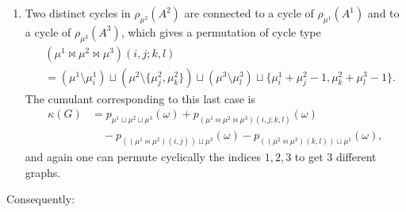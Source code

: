 \documentclass[12pt,a4paper,reqno]{amsart}
\theoremstyle{remark}
\begin{document}
\begin{enumerate}
\begin{align*}
&\,\,\,\,\,\,-p_{((\mu^{2}\Join \mu^{3})(j,k)) \sqcup \mu^{1}}(\omega)-p_{((\mu^{1}\Join \mu^{3})(i,k)) \sqcup \mu^{2}}(\omega).\end{align*}
Here, there is no need to permute cyclically the indices in the enumeration for $N_{G}$.\vspace{2mm}
\item Two distinct cycles in $\rho_{\mu^{2}}(A^{2})$ are connected to a cycle of $\rho_{\mu^{1}}(A^{1})$ and to a cycle of $\rho_{\mu^{3}}(A^{3})$, which gives a permutation of cycle type
\begin{align*}
&( \mu^{1} \Join \mu^{2} \Join \mu^{3}) (i,j;k,l)\\
&=(\mu^{1}\setminus \mu^{1}_{i})\sqcup (\mu^{2}\setminus \{\mu^{2}_{j},\mu^{2}_{k}\})\sqcup (\mu^{3}\setminus \mu^{3}_{l})\sqcup\{\mu^{1}_{i}+\mu^{2}_{j}-1,\mu^{2}_{k}+\mu^{3}_{l}-1\}.
\end{align*}
The cumulant corresponding to this last  case is
\begin{align*}\kappa(G)&=p_{\mu^{1}\sqcup \mu^{2}\sqcup \mu^{3}}(\omega)+p_{(\mu^{1}\Join \mu^{2}\Join \mu^{3})(i,j;k,l)}(\omega)\\
&\,\,\,\,\,\,-p_{((\mu^{1}\Join \mu^{2})(i,j)) \sqcup \mu^{3}}(\omega)-p_{((\mu^{2}\Join \mu^{3})(k,l)) \sqcup \mu^{1}}(\omega),\end{align*}
and again one can permute cyclically the indices $1,2,3$ to get $3$ different graphs.\vspace{2mm}
\end{enumerate}
Consequently:
\end{document}
